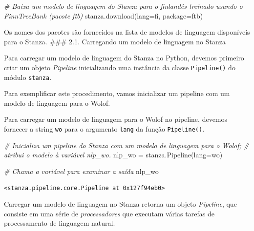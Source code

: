 \documentclass[
  brazilian,
]{article}
\newenvironment{Shaded}{}{}
\newcommand{\CommentTok}[1]{\textcolor[rgb]{0.38,0.63,0.69}{\textit{#1}}}
\newcommand{\NormalTok}[1]{#1}
\newcommand{\OperatorTok}[1]{\textcolor[rgb]{0.40,0.40,0.40}{#1}}
\newcommand{\StringTok}[1]{\textcolor[rgb]{0.25,0.44,0.63}{#1}}
\begin{document}
\begin{Shaded}
\begin{Highlighting}[]
\CommentTok{\# Baixa um modelo de linguagem do Stanza para o finlandês treinado usando o FinnTreeBank (pacote \textquotesingle{}ftb\textquotesingle{})}
\NormalTok{stanza.download(lang}\OperatorTok{=}\StringTok{\textquotesingle{}fi\textquotesingle{}}\NormalTok{, package}\OperatorTok{=}\StringTok{\textquotesingle{}ftb\textquotesingle{}}\NormalTok{)}
\end{Highlighting}
\end{Shaded}

Os nomes dos pacotes são fornecidos na lista de modelos de linguagem
disponíveis para o Stanza. \#\#\# 2.1. Carregando um modelo de linguagem
no Stanza

Para carregar um modelo de linguagem do Stanza no Python, devemos
primeiro criar um objeto \emph{Pipeline} inicializando uma instância da
classe \texttt{Pipeline()} do módulo \texttt{stanza}.

Para exemplificar este procedimento, vamos inicializar um pipeline com
um modelo de linguagem para o Wolof.

Para carregar um modelo de linguagem para o Wolof no pipeline, devemos
fornecer a string \texttt{\textquotesingle{}wo\textquotesingle{}} para o
argumento \texttt{lang} da função \texttt{Pipeline()}.

\begin{Shaded}
\begin{Highlighting}[]
\CommentTok{\# Inicializa um pipeline do Stanza com um modelo de linguagem para o Wolof;}
\CommentTok{\# atribui o modelo à variável \textquotesingle{}nlp\_wo\textquotesingle{}.}
\NormalTok{nlp\_wo }\OperatorTok{=}\NormalTok{ stanza.Pipeline(lang}\OperatorTok{=}\StringTok{\textquotesingle{}wo\textquotesingle{}}\NormalTok{)}
\end{Highlighting}
\end{Shaded}

\begin{Shaded}
\begin{Highlighting}[]
\CommentTok{\# Chama a variável para examinar a saída}
\NormalTok{nlp\_wo}
\end{Highlighting}
\end{Shaded}

\begin{verbatim}
<stanza.pipeline.core.Pipeline at 0x127f94eb0>
\end{verbatim}

Carregar um modelo de linguagem no Stanza retorna um objeto
\emph{Pipeline}, que consiste em uma série de \emph{processadores} que
executam várias tarefas de processamento de linguagem natural.
\end{document}
